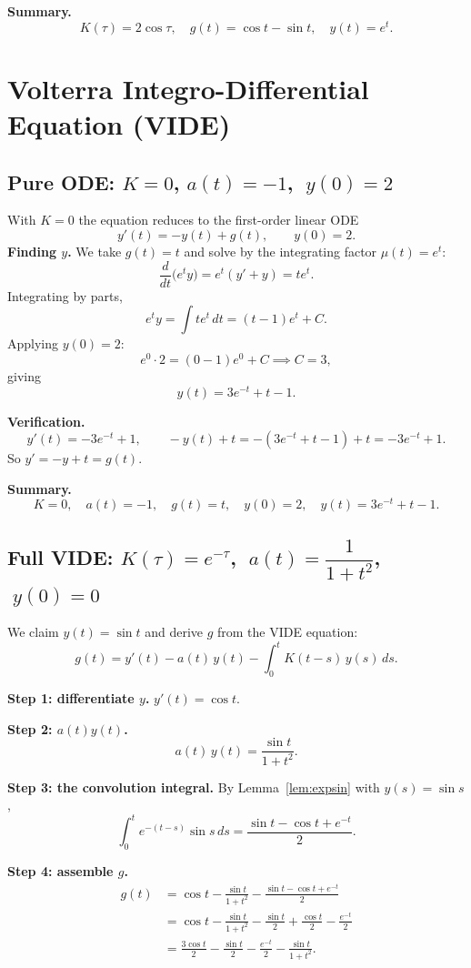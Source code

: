 \documentclass[11pt]{article}
\begin{document}
\medskip\noindent\textbf{Summary.}
\[
  \boxed{K(\tau)=2\cos\tau,\quad g(t)=\cos t-\sin t,\quad y(t)=e^t.}
\]

\section{Volterra Integro-Differential Equation (VIDE)}

\subsection{Pure ODE: $K=0$, $a(t)=-1$, $\;y(0)=2$}

With $K=0$ the equation reduces to the first-order linear ODE
\[
  y'(t) = -y(t) + g(t), \qquad y(0) = 2.
\]
\noindent\textbf{Finding $y$.}
We take $g(t)=t$ and solve by the integrating factor $\mu(t)=e^t$:
\[
  \frac{d}{dt}\bigl(e^t y\bigr) = e^t(y'+y) = te^t.
\]
Integrating by parts,
\[
  e^t y = \int te^t\,dt = (t-1)e^t + C.
\]
Applying $y(0)=2$:
\[
  e^0\cdot 2 = (0-1)e^0 + C \implies C = 3,
\]
giving
\[
  y(t) = 3e^{-t} + t - 1.
\]

\medskip\noindent\textbf{Verification.}
\[
  y'(t) = -3e^{-t}+1, \qquad
  -y(t)+t = -(3e^{-t}+t-1)+t = -3e^{-t}+1.
\]
So $y'=-y+t=g(t)$. \checkmark

\medskip\noindent\textbf{Summary.}
\[
  \boxed{K=0,\quad a(t)=-1,\quad g(t)=t,\quad y(0)=2,\quad
         y(t)=3e^{-t}+t-1.}
\]

\subsection{Full VIDE: $K(\tau)=e^{-\tau}$, $\;a(t)=\dfrac{1}{1+t^2}$, $\;y(0)=0$}

We claim $y(t)=\sin t$ and derive $g$ from the VIDE equation:
\[
  g(t) = y'(t) - a(t)\,y(t) - \int_0^t K(t-s)\,y(s)\,ds.
\]

\medskip\noindent\textbf{Step 1: differentiate $y$.}
$y'(t) = \cos t$.

\medskip\noindent\textbf{Step 2: $a(t)y(t)$.}
\[
  a(t)\,y(t) = \frac{\sin t}{1+t^2}.
\]

\medskip\noindent\textbf{Step 3: the convolution integral.}
By Lemma~\ref{lem:expsin} with $y(s)=\sin s$,
\[
  \int_0^t e^{-(t-s)}\sin s\,ds = \frac{\sin t-\cos t+e^{-t}}{2}.
\]

\medskip\noindent\textbf{Step 4: assemble $g$.}
\begin{align*}
  g(t) &= \cos t - \frac{\sin t}{1+t^2}
         - \frac{\sin t-\cos t+e^{-t}}{2} \\[4pt]
       &= \cos t - \frac{\sin t}{1+t^2}
         - \frac{\sin t}{2} + \frac{\cos t}{2} - \frac{e^{-t}}{2} \\[4pt]
       &= \frac{3\cos t}{2} - \frac{\sin t}{2}
         - \frac{e^{-t}}{2} - \frac{\sin t}{1+t^2}.
\end{align*}
\end{document}
